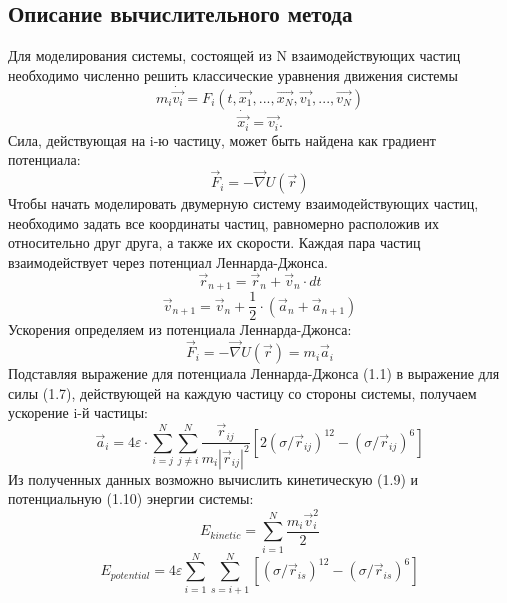 \documentclass[14pt,a4paper,report]{ncc}
\begin{document}
\subsection{Описание вычислительного метода}
Для моделирования системы, состоящей из N взаимодействующих частиц необходимо численно решить классические уравнения движения системы
\begin{equation}
m_{i}\dot{\vec{v_i}}=F_{i}(t, \vec{x_1}, ... ,  \vec{x_N}, \vec{v_1}, ... , \vec{v_N})
\end{equation}
\begin{equation}
\dot{\vec{x_i}}=\vec{v_i}.
\end{equation}
Сила, действующая на i-ю частицу, может быть найдена как градиент потенциала: 
\begin{equation}
\vec{F}_i= -\vec{\nabla}U(\vec{r})
\end{equation} 
Чтобы начать моделировать двумерную систему взаимодействующих частиц, необходимо задать все координаты частиц, равномерно расположив их относительно друг друга, а также их скорости. Каждая пара частиц взаимодействует через потенциал Леннарда-Джонса.
\begin{equation}
\vec{r}_{n+1} = \vec{r}_{n} + \vec{v}_{n}\cdot{dt}
\end{equation}
\begin{equation}
\vec{v}_{n+1}=\vec{v}_{n}+\frac{1}{2} \cdot (\vec{a}_n+\vec{a}_{n+1})
\end{equation}
Ускорения определяем из потенциала Леннарда-Джонса:
\begin{equation}
\vec{F}_i= -\vec{\nabla}U(\vec{r}) = m_i \vec{a}_i
\end{equation}
Подставляя выражение для потенциала Леннарда-Джонса (1.1) в выражение для силы (1.7), действующей на каждую частицу со стороны системы, получаем ускорение i-й частицы:
\begin{equation}
\vec{a}_i=4  \varepsilon \cdot  \sum\limits_{i=j}^N \sum\limits_{j \neq i}^N{\frac{\vec{r}_{ij}}{m_i | \vec{r}_{ij}|^2}  [2  (\sigma/\vec{r}_{ij})^{12}-(\sigma/\vec{r}_{ij})^6]}
\end{equation}
Из полученных данных возможно вычислить кинетическую (1.9) и потенциальную (1.10) энергии системы:
\begin{equation}
E_{kinetic} = \sum\limits_{i=1}^N{\frac{m_i {\vec{v}}^2_i}{2}}
\end{equation}
\begin{equation}
E_{potential}=4 \varepsilon \sum\limits_{i=1}^N \sum\limits_{s=i+1}^N{ [(\sigma/\vec{r}_{is})^{12} - (\sigma/\vec{r}_{is})^{6}  ]}
\end{equation}
\end{document}
